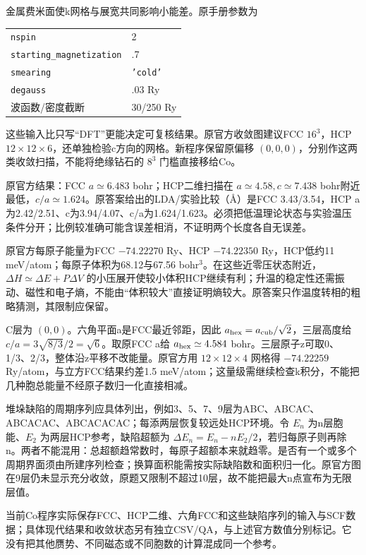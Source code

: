 \begin{solution}
金属费米面使k网格与展宽共同影响小能差。原手册参数为
\begin{center}\begin{tabular}{ll}
\texttt{nspin}&2\\\texttt{starting\_magnetization}&.7\\
\texttt{smearing}&\texttt{'cold'}\\\texttt{degauss}&.03 Ry\\
波函数/密度截断&30/250 Ry
\end{tabular}\end{center}
这些输入比只写“DFT”更能决定可复核结果。原官方收敛图建议FCC $16^3$，HCP $12\times12\times6$，还单独检验c方向的网格。新程序保留原偏移 $(0,0,0)$，分别作这两类收敛扫描，不能将绝缘钻石的 $8^3$ 门槛直接移给Co。

原官方结果：FCC $a\simeq6.483$ bohr；HCP二维扫描在 $a\simeq4.58,c\simeq7.438$ bohr附近最低，$c/a\simeq1.624$。原答案给出的LDA/实验比较（\AA）是FCC 3.43/3.54，HCP a为2.42/2.51、c为3.94/4.07、c/a为1.624/1.623。必须把低温理论状态与实验温压条件分开；比例较准确可能含误差相消，不证明两个长度各自无误差。

原官方每原子能量为FCC $-74.22270$ Ry、HCP $-74.22350$ Ry，HCP低约11 meV/atom；每原子体积为68.12与67.56 bohr$^3$。在这些近零压状态附近，$\Delta H\simeq\Delta E+P\Delta V$ 的小压展开使较小体积HCP继续有利；升温的稳定性还需振动、磁性和电子熵，不能由“体积较大”直接证明熵较大。原答案只作温度转相的粗略猜测，其限制应保留。

C层为 $(0,0)$。六角平面a是FCC最近邻距，因此 $a_{\rm hex}=a_{\rm cub}/\sqrt2$，三层高度给 $c/a=3\sqrt{8/3}/2=\sqrt6$。取原FCC a给 $a_{\rm hex}\simeq4.584$ bohr。三层原子z可取0、1/3、2/3，整体沿z平移不改能量。原官方用 $12\times12\times4$ 网格得 $-74.22259$ Ry/atom，与立方FCC结果约差1.5 meV/atom；这量级需继续检查k积分，不能把几种胞总能量不经原子数归一化直接相减。

堆垛缺陷的周期序列应具体列出，例如3、5、7、9层为ABC、ABCAC、ABCACAC、ABCACACAC；每添两层恢复较远处HCP环境。令 $E_n$ 为n层胞能、$E_2$ 为两层HCP参考，缺陷超额为 $\Delta E_n=E_n-nE_2/2$，若归每原子则再除n。两者不能混用：总超额趋常数时，每原子超额本来就趋零。是否有一个或多个周期界面须由所建序列检查；换算面积能需按实际缺陷数和面积归一化。原官方图在9层仍未显示充分收敛，原题又限制不超过10层，故不能把最大n点宣布为无限层值。

当前Co程序实际保存FCC、HCP二维、六角FCC和这些缺陷序列的输入与SCF数据；具体现代结果和收敛状态另有独立CSV/QA，与上述官方数值分别标记。它没有把其他赝势、不同磁态或不同胞数的计算混成同一个参考。
\end{solution}

